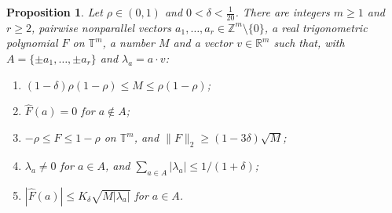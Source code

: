 \documentclass[11pt,reqno]{amsart}
\newtheorem{proposition}[theorem]{Proposition}
\theoremstyle{definition}
\newcommand{\T}{\mathbb{T}}
\newcommand{\Z}{\mathbb{Z}}
\newcommand{\R}{\mathbb{R}}
\begin{document}
\begin{proposition}\label{prop:aux}
Let $\rho\in(0,1)$ and $0<\delta<\frac1{20}$. There are integers $m\ge1$ and $r\ge2$, pairwise nonparallel vectors $a_1,\dots,a_r\in\Z^m\setminus\{0\}$, a real trigonometric polynomial $F$ on $\T^m$, a number $M$ and a vector $v\in\R^m$ such that, with $A=\{\pm a_1,\dots,\pm a_r\}$ and $\lambda_a=a\cdot v$:
\begin{enumerate}
\item[(i)] $(1-\delta)\rho(1-\rho)\le M\le\rho(1-\rho)$;
\item[(ii)] $\widehat F(a)=0$ for $a\notin A$;
\item[(iii)] $-\rho\le F\le1-\rho$ on $\T^m$, and $\|F\|_2\ge(1-3\delta)\sqrt M$;
\item[(iv)] $\lambda_a\ne0$ for $a\in A$, and $\sum_{a\in A}|\lambda_a|\le1/(1+\delta)$;
\item[(v)] $|\widehat F(a)|\le K_\delta\sqrt{M|\lambda_a|}$ for $a\in A$.
\end{enumerate}
\end{proposition}
\end{document}

